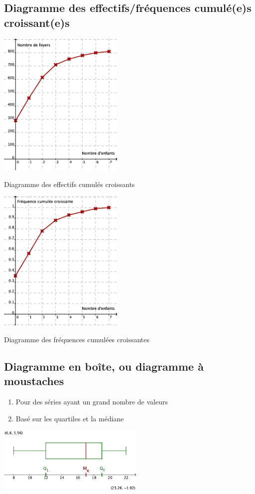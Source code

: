 \subsection{Diagramme des effectifs/fréquences cumulé(e)s croissant(e)s}

\begin{multicols}{2}
  \begin{center}
    \includegraphics[width=6cm]{Stats_Fig4_DiagEffCum.png}
    
    Diagramme des effectifs cumulés croissants    
  \end{center}

  \columnbreak
  \begin{center}
    \includegraphics[width=6cm]{Stats_Fig4_DiagFreqCum.png}

    Diagramme des fréquences cumulées croissantes
  \end{center}
\end{multicols}



\subsection{Diagramme en boîte, ou diagramme à moustaches}

\begin{enumerate}
\item Pour des séries ayant un grand nombre de valeurs
\item Basé sur les quartiles et la médiane
\end{enumerate}

\begin{center}
  \includegraphics[width=7cm]{Stats_Fig4_DiagBoite.png}  
\end{center}

